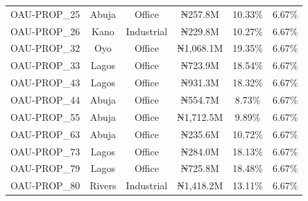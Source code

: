 \begin{table}[htbp]
\begin{tabular}{lccccc}
OAU-PROP_25 & Abuja & Office & ₦257.8M & 10.33\% & 6.67\% \\
OAU-PROP_26 & Kano & Industrial & ₦229.8M & 10.27\% & 6.67\% \\
OAU-PROP_32 & Oyo & Office & ₦1,068.1M & 19.35\% & 6.67\% \\
OAU-PROP_33 & Lagos & Office & ₦723.9M & 18.54\% & 6.67\% \\
OAU-PROP_43 & Lagos & Office & ₦931.3M & 18.32\% & 6.67\% \\
OAU-PROP_44 & Abuja & Office & ₦554.7M & 8.73\% & 6.67\% \\
OAU-PROP_55 & Abuja & Office & ₦1,712.5M & 9.89\% & 6.67\% \\
OAU-PROP_63 & Abuja & Office & ₦235.6M & 10.72\% & 6.67\% \\
OAU-PROP_73 & Lagos & Office & ₦284.0M & 18.13\% & 6.67\% \\
OAU-PROP_79 & Lagos & Office & ₦725.8M & 18.48\% & 6.67\% \\
OAU-PROP_80 & Rivers & Industrial & ₦1,418.2M & 13.11\% & 6.67\% \\
\hline
\end{tabular}
\end{table}
